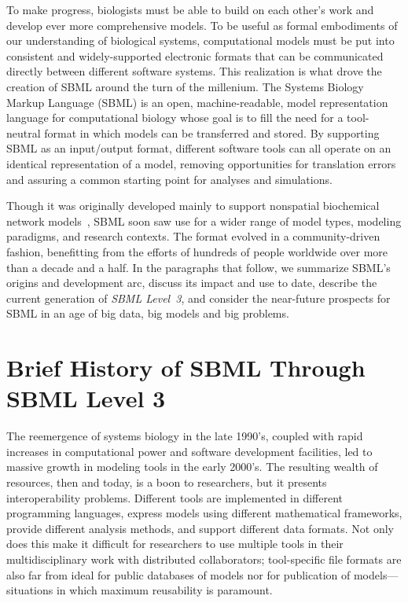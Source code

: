 To make progress, biologists must be able to build on each other's work and develop ever more comprehensive models.  To be useful as formal embodiments of our understanding of biological systems, computational models must be put into consistent and widely-supported electronic formats that can be communicated directly between different software systems.  This realization is what drove the creation of SBML around the turn of the millenium.  The Systems Biology Markup Language (SBML) is an open, machine-readable, model representation language for computational biology whose goal is to fill the need for a tool-neutral format in which models can be transferred and stored.  By supporting SBML as an input/output format, different software tools can all operate on an identical representation of a model, removing opportunities for translation errors and assuring a common starting point for analyses and simulations.

Though it was originally developed mainly to support nonspatial biochemical network models~\citep{hucka2003systems}, SBML soon saw use for a wider range of model types, modeling paradigms, and research contexts.  The format evolved in a community-driven fashion, benefitting from the efforts of hundreds of people worldwide over more than a decade and a half.  In the paragraphs that follow, we summarize SBML's origins and development arc, discuss its impact and use to date, describe the current generation of \emph{SBML Level~3}, and consider the near-future prospects for SBML in an age of big data, big models and big problems.


\section{Brief History of SBML Through SBML Level 3}

The reemergence of systems biology in the late 1990's, coupled with rapid increases in computational power and software development facilities, led to massive growth in modeling tools in the early 2000's.  The resulting wealth of resources, then and today, is a boon to researchers, but it presents interoperability problems.  Different tools are implemented in different programming languages, express models using different mathematical frameworks, provide different analysis methods, and support different data formats.  Not only does this make it difficult for researchers to use multiple tools in their multidisciplinary work with distributed collaborators; tool-specific file formats are also far from ideal for public databases of models nor for publication of models---situations in which maximum reusability is paramount.

